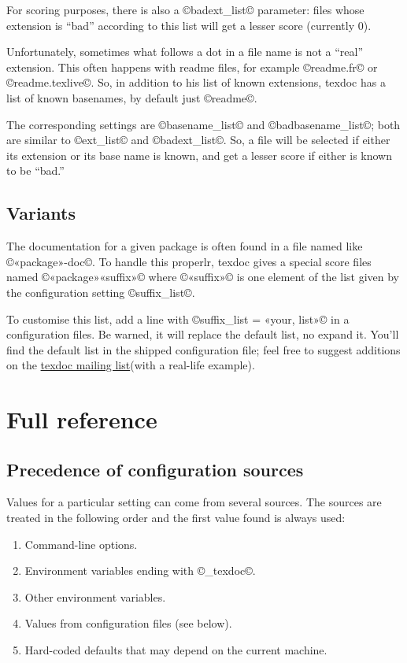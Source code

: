 \documentclass[a4paper, oneside]{scrartcl}
\newcommand\tdml{\href{http://lists.tug.org/texdoc}{texdoc mailing list}\xspace}
\begin{document}
For scoring purposes, there is also a ©badext_list© parameter: files whose
extension is ``bad'' according to this list will get a lesser score (currently
0).

Unfortunately, sometimes what follows a dot in a file name is not a ``real''
extension. This often happens with readme files, for example ©readme.fr© or
©readme.texlive©. So, in addition to his list of known extensions, texdoc has
a list of known basenames, by default just ©readme©.

The corresponding settings are ©basename_list© and ©badbasename_list©; both
are similar to ©ext_list© and ©badext_list©. So, a file will be selected if
either its extension or its base name is known, and get a lesser score if
either is known to be ``bad.''

\subsection{Variants}\label{ss-variants}

The documentation for a given package is often found in a file named like
©«package»-doc©. To handle this properlr, texdoc gives a special score files
named ©«package»«suffix»© where ©«suffix»© is one element of the list given by
the configuration setting ©suffix_list©.

To customise this list, add a line with ©suffix_list = «your, list»© in a
configuration files. Be warned, it will replace the default list, no expand
it. You'll find the default list in the shipped configuration file; feel free
to suggest additions on the \tdml (with a real-life example).

\clearpage

\section{Full reference}

\subsection{Precedence of configuration sources}\label{ss-prec}

Values for a particular setting can come from several sources. The sources are
treated in the following order and the first value found is always used:
\begin{enumerate}
  \item Command-line options.
  \item Environment variables ending with ©_texdoc©.
  \item Other environment variables.
  \item Values from configuration files (see below).
  \item Hard-coded defaults that may depend on the current machine.
\end{enumerate}
\end{document}
